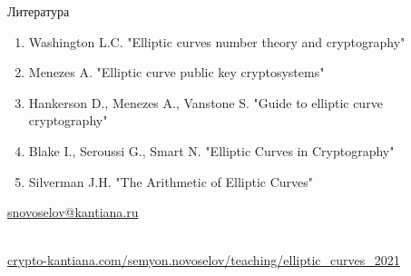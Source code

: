 \documentclass{beamer}
\begin{document}
\begin{frame}{Литература}
\begin{enumerate}
    \item Washington L.C. "Elliptic curves number theory and cryptography"%
    \item Menezes A. "Elliptic curve public key cryptosystems"
    \item Hankerson D., Menezes A., Vanstone S. "Guide to elliptic curve cryptography"
    \item Blake I., Seroussi G., Smart N. "Elliptic Curves in Cryptography"
    \item Silverman J.H. "The Arithmetic of Elliptic Curves"%
\end{enumerate}


\begin{center}
    \begin{tcolorbox}[enhanced,hbox,colback=block-green-color-bg,colframe=subsection-color!120,title=Контакты,center title]
        \begin{varwidth}{\textwidth}
            \begin{center}
                \href{mailto:snovoselov@kantiana.ru}{snovoselov@kantiana.ru}
            \end{center}
        \end{varwidth}
    \end{tcolorbox}	
\end{center}

\\
{\footnotesize
    \href{https://crypto-kantiana.com/semyon.novoselov/teaching/elliptic_curves_2021}{crypto-kantiana.com/semyon.novoselov/teaching/elliptic\_curves\_2021}
}
\end{frame}
\end{document}

